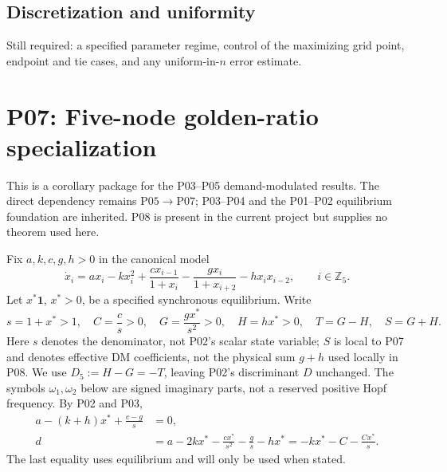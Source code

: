 \documentclass[11pt]{article}
\newcommand{\Z}{\mathbb{Z}}
\newcommand{\one}{\mathbf{1}}
\theoremstyle{definition}
\theoremstyle{remark}
\begin{document}
\subsection{Discretization and uniformity}\label{slot:P06-2}
Still required: a specified parameter regime, control of the maximizing
grid point, endpoint and tie cases, and any uniform-in-$n$ error estimate.


\section{P07: Five-node golden-ratio specialization}
\label{sec:P07}
This is a corollary package for the P03--P05 demand-modulated
results. The direct dependency remains $\mathrm{P05}\to\mathrm{P07}$;
P03--P04 and the P01--P02 equilibrium foundation are inherited.
P08 is present in the current project but supplies no theorem used here.

Fix $a,k,c,g,h>0$ in the canonical model
\begin{equation}
 \dot x_i=ax_i-kx_i^2+\frac{cx_{i-1}}{1+x_i}
       -\frac{gx_i}{1+x_{i+2}}-hx_ix_{i-2},\qquad i\in\Z_5.
 \label{eq:P07-model}
\end{equation}
Let $x^*\one$, $x^*>0$, be a specified synchronous equilibrium. Write
\begin{equation}
 s=1+x^*>1,\quad C=\frac cs>0,\quad G=\frac{gx^*}{s^2}>0,
 \quad H=hx^*>0,\quad T=G-H,\quad S=G+H.
 \label{eq:P07-coefficients}
\end{equation}
Here $s$ denotes the denominator, not P02's scalar state variable;
$S$ is local to P07 and denotes effective DM coefficients, not the
physical sum $g+h$ used locally in P08. We use $D_5:=H-G=-T$,
leaving P02's discriminant $D$ unchanged. The symbols $\omega_1,\omega_2$
below are signed imaginary parts, not a reserved positive Hopf frequency.
By P02 and P03,
\begin{align}
 a-(k+h)x^*+\frac{c-g}{s}&=0,\label{eq:P07-equilibrium}\\
 d&=a-2kx^*-\frac{cx^*}{s^2}-\frac gs-hx^*
   =-kx^*-C-\frac{Cx^*}{s}.\label{eq:P07-d}
\end{align}
The last equality uses equilibrium and will only be used when stated.
\end{document}
